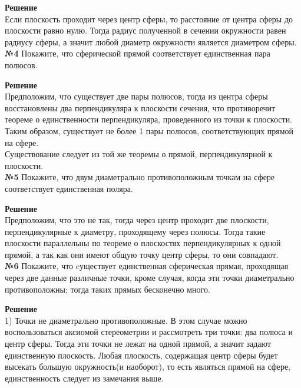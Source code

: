     \textbf{Решение}\\

    Если плоскость проходит через центр сферы, то расстояние от центра сферы до плоскости равно нулю.
    Тогда радиус полученной в сечении окружности равен радиусу сферы, а значит любой диаметр окружности является диаметром сферы.\\


    \textbf{№4}
    Покажите, что сферической прямой соответствует единственная пара полюсов.

    \textbf{Решение}\\

    Предположим, что существует две пары полюсов, тогда из центра сферы восстановлены два перпендикуляра к плоскости сечения,
    что противоречит теореме о единственности перпендикуляра, проведенного из точки к плоскости.\\

    Таким образом, существует не более 1 пары полюсов, соответствующих прямой на сфере.\\

    Существование следует из той же теоремы о прямой, перпендикулярной к плоскости.\\


    \textbf{№5}
    Покажите, что двум диаметрально противоположным точкам на сфере соответствует единственная поляра.

    \textbf{Решение}\\

    Предположим, что это не так, тогда через центр проходит две плоскости, перпендикулярные к диаметру, проходящему через полюсы.
    Тогда такие плоскости параллельны по теореме о плоскостях перпендикулярных к одной прямой,
    а так как они имеют общую точку центр сферы, то они совпадают.\\


    \textbf{№6}
    Покажите, что cуществует единственная сферическая прямая, проходящая через две данные различные точки,
    кроме случая, когда эти точки диаметрально противоположны;
    тогда таких прямых бесконечно много.

    \textbf{Решение}\\

    1) Точки не диаметрально противоположные.
    В этом случае можно воспользоваться аксиомой стереометрии и рассмотреть три точки: два полюса и центр сферы.
    Тогда эти точки не лежат на одной прямой, а значит задают единственную плоскость.
    Любая плоскость, содержащая центр сферы будет высекать большую окружность(и наоборот), то есть являться прямой на сфере,
    единственность следует из замечания выше.

